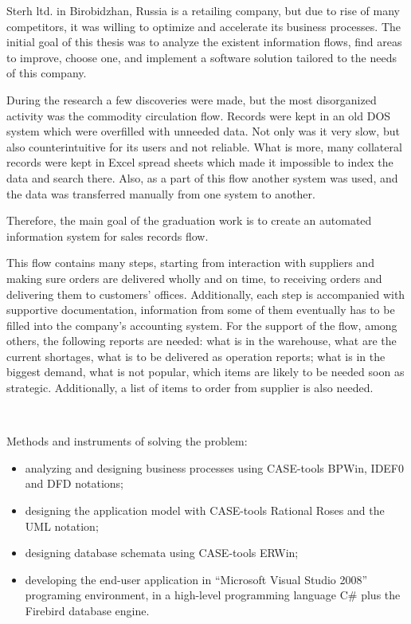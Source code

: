 \documentclass[a4paper, 12pt]{article}
\begin{document}
Sterh ltd. in Birobidzhan, Russia is a retailing company, but due to rise of many competitors, it was willing to optimize and accelerate its business processes. The initial goal of this thesis was to analyze the existent information flows, find areas to improve, choose one, and implement a software solution tailored to the needs of this company.

During the research a few discoveries were made, but the most disorganized activity was the commodity circulation flow. Records were kept in an old DOS system which were overfilled with unneeded data. Not only was it very slow, but also counterintuitive for its users and not reliable. What is more, many collateral records were kept in Excel spread sheets which made it impossible to index the data and search there. Also, as a part of this flow another system was used, and the data was transferred manually from one system to another.

Therefore, the main goal of the graduation work is to create an automated information system for sales records flow.

This flow contains many steps, starting from interaction with suppliers and making sure orders are delivered wholly and on time, to receiving orders and delivering them to customers' offices. Additionally, each step is accompanied with supportive documentation, information from some of them eventually has to be filled into the company's accounting system. For the support of the flow, among others, the following reports are needed: what is in the warehouse, what are the current shortages, what is to be delivered as operation reports; what is in the biggest demand, what is not popular, which items are likely to be needed soon as strategic. Additionally, a list of items to order from supplier is also needed.

\

Methods and instruments of solving the problem:

\begin{itemize}
\itemsep0pt
\item analyzing and designing business processes using CASE-tools BPWin, IDEF0 and DFD notations;
\item designing the application model with CASE-tools Rational Roses and the UML notation;
\item designing database schemata using CASE-tools ERWin;
\item developing the end-user application in ``Microsoft Visual Studio 2008'' programing environment, in a high-level programming language C\# plus the Firebird database engine.
\end{itemize}
\end{document}
